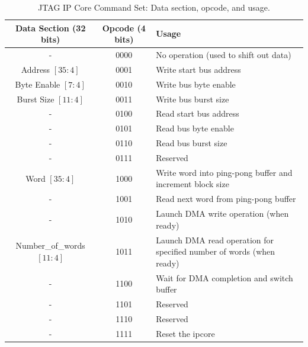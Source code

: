 \documentclass[a4paper,11pt,oneside]{report}
\begin{document}
\begin{table}[h!]
    \centering
    \begin{tabular}{|c|c|p{8cm}|}
        \hline
        \textbf{Data Section (32 bits)} & \textbf{Opcode (4 bits)} & \textbf{Usage} \\
        \hline
        -                               & 0000                     & No operation (used to shift out data) \\
        Address $[35:4]$                & 0001                     & Write start bus address \\
        Byte Enable $[7:4]$             & 0010                     & Write bus byte enable \\
        Burst Size $[11:4]$             & 0011                     & Write bus burst size \\
        -                               & 0100                     & Read start bus address \\
        -                               & 0101                     & Read bus byte enable \\
        -                               & 0110                     & Read bus burst size \\
        -                               & 0111                     & Reserved \\
        Word $[35:4]$                   & 1000                     & Write word into ping-pong buffer and increment block size \\
        -                               & 1001                     & Read next word from ping-pong buffer \\
        -                               & 1010                     & Launch DMA write operation (when ready) \\
        Number\_of\_words $[11:4]$      & 1011                     & Launch DMA read operation for specified number of words (when ready) \\
        -                               & 1100                     & Wait for DMA completion and switch buffer \\
        -                               & 1101                     & Reserved \\
        -                               & 1110                     & Reserved \\
        -                               & 1111                     & Reset the ipcore \\
        \hline
    \end{tabular}
    \caption{JTAG IP Core Command Set: Data section, opcode, and usage.}

\end{table}
\end{document}
